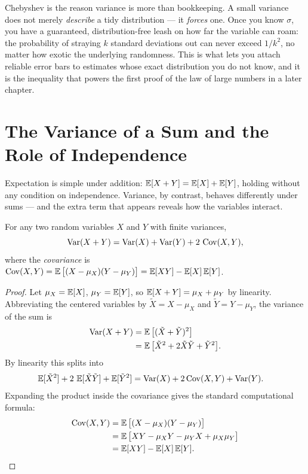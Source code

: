 \begin{aestheticbox}
Chebyshev is the reason variance is more than bookkeeping. A small variance
does not merely \emph{describe} a tidy distribution --- it \emph{forces} one.
Once you know $\sigma$, you have a guaranteed, distribution-free leash on how
far the variable can roam: the probability of straying $k$ standard deviations
out can never exceed $1/k^2$, no matter how exotic the underlying randomness.
This is what lets you attach reliable error bars to estimates whose exact
distribution you do not know, and it is the inequality that powers the first
proof of the law of large numbers in a later chapter.
\end{aestheticbox}

\section{The Variance of a Sum and the Role of Independence}
\label{ch09:sumindep}

Expectation is simple under addition: $\operatorname{\mathbb{E}}[X+Y] = \operatorname{\mathbb{E}}[X] + \operatorname{\mathbb{E}}[Y]$,
holding without any condition on independence. Variance, by contrast, behaves
differently under sums --- and the extra term that appears reveals how the variables interact.

\begin{theorem}
\label{ch09:thm-sum2}
For any two random variables $X$ and $Y$ with finite variances,
\[
  \operatorname{Var}(X+Y) = \operatorname{Var}(X) + \operatorname{Var}(Y) + 2\,\operatorname{Cov}(X,Y),
\]
where the \emph{covariance} is
$\operatorname{Cov}(X,Y) = \operatorname{\mathbb{E}}\big[(X-\mu_X)(Y-\mu_Y)\big]
= \operatorname{\mathbb{E}}[XY] - \operatorname{\mathbb{E}}[X]\operatorname{\mathbb{E}}[Y]$.
\end{theorem}

\begin{proof}
Let $\mu_X = \operatorname{\mathbb{E}}[X]$, $\mu_Y = \operatorname{\mathbb{E}}[Y]$, so $\operatorname{\mathbb{E}}[X+Y] = \mu_X + \mu_Y$ by linearity.
Abbreviating the centered variables by $\tilde X = X-\mu_X$ and
$\tilde Y = Y-\mu_Y$, the variance of the sum is
\begin{align*}
  \operatorname{Var}(X+Y) &= \operatorname{\mathbb{E}}\big[(\tilde X + \tilde Y)^2\big] \\
  &= \operatorname{\mathbb{E}}\big[\tilde X^2 + 2\tilde X\tilde Y + \tilde Y^2\big].
\end{align*}
By linearity this splits into
\begin{align*}
  \operatorname{\mathbb{E}}[\tilde X^2] + 2\,\operatorname{\mathbb{E}}[\tilde X \tilde Y] + \operatorname{\mathbb{E}}[\tilde Y^2]
  &= \operatorname{Var}(X) + 2\operatorname{Cov}(X,Y) + \operatorname{Var}(Y).
\end{align*}
Expanding the product inside the covariance gives the standard computational formula:
\begin{align*}
  \operatorname{Cov}(X,Y) &= \operatorname{\mathbb{E}}\big[(X-\mu_X)(Y-\mu_Y)\big] \\
  &= \operatorname{\mathbb{E}}\big[XY - \mu_X Y - \mu_Y X + \mu_X\mu_Y\big] \\
  &= \operatorname{\mathbb{E}}[XY] - \operatorname{\mathbb{E}}[X]\operatorname{\mathbb{E}}[Y]. \qedhere
\end{align*}
\end{proof}

